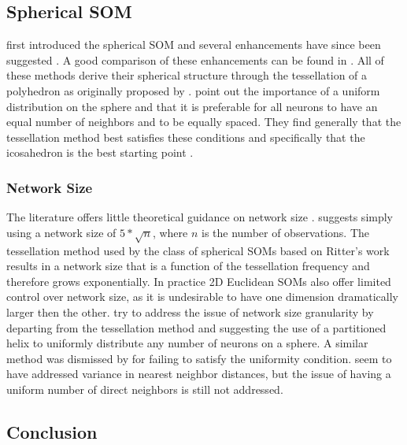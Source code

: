 \documentclass[11pt]{article}
\begin{document}
\subsection{Spherical SOM}
\cite{ritter99} first introduced the spherical SOM and several
enhancements have since been suggested 
\citep{boudjemai2003,sangole03,Nishio:2006fk,Wu:2006lr}.  A good
comparison of these enhancements can be found in \citep{Wu:2006lr}.  All of
these methods derive their spherical structure through the tessellation of a
polyhedron as originally proposed by \citeauthor{ritter99}.  \cite{Wu:2006lr}
point out the importance of a uniform distribution on the sphere and that it is
preferable for all neurons to have an equal number of neighbors and to be
equally spaced.  They find generally that the tessellation method best
satisfies these conditions and specifically that the icosahedron is the best
starting point \citep{wu2005}.

\subsubsection{Network Size}
The literature offers little theoretical guidance on network size
\citep{cho1996}.  \cite{toolbox} suggests simply using a network
size of \(5*\sqrt {n}\), where \(n\) is the number of observations.
The tessellation method used by the class of spherical SOMs
based on Ritter's work results in a network size that is a function of the
tessellation frequency and therefore grows exponentially. In practice 2D
Euclidean SOMs also offer limited control over network size, as it is
undesirable to have one dimension dramatically larger then the other.
\cite{Nishio:2006fk} try to address the issue of network size granularity by
departing from the tessellation method and suggesting the use of a partitioned
helix to uniformly distribute any number of neurons on a sphere.  A similar
method was dismissed by \cite{wu2005} for failing to satisfy the uniformity
condition.  \citeauthor{Nishio:2006fk} seem to have addressed variance in 
nearest neighbor distances, but the issue of having a uniform number of direct
neighbors is still not addressed.

\subsection{Conclusion}
\end{document}
